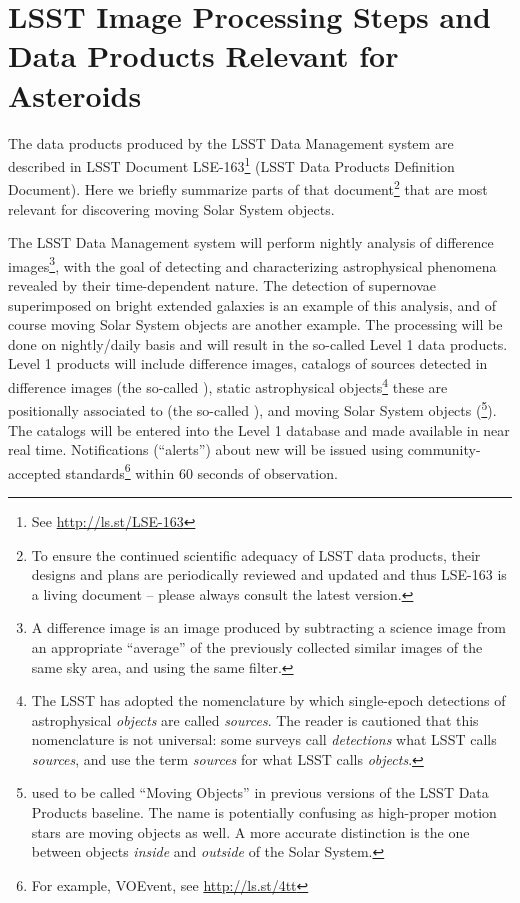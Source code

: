 \section{LSST Image Processing Steps and Data Products Relevant for Asteroids} \label{sec:AppA}

The data products produced by the LSST Data Management system are described in
LSST Document LSE-163\footnote{See \url{http://ls.st/LSE-163}} (LSST Data Products
Definition Document). Here we briefly summarize parts of that
document\footnote{To ensure the continued scientific adequacy of LSST data
products, their designs and plans are periodically reviewed and updated and
thus LSE-163 is a living document -- please always consult the latest version.}
that are most relevant for discovering moving Solar System objects.

The LSST Data Management system will perform nightly analysis of difference images\footnote{A difference
image is an image produced by subtracting a science image from an appropriate
``average'' of the previously collected similar images of the same sky area, and using the
same filter.}, with the goal of detecting and characterizing astrophysical phenomena
revealed by their time-dependent nature. The detection of supernovae superimposed
on bright extended galaxies is an example of this analysis, and of course moving Solar
System objects are another example. The processing will be done on nightly/daily
basis and will result in the so-called Level 1 data products. Level 1 products will include
difference images, catalogs of sources detected in difference images (the so-called
\DIASources), static astrophysical objects\footnote{The LSST has adopted the nomenclature by
which single-epoch detections of astrophysical {\em objects} are called {\em sources}.
The reader is cautioned that this nomenclature is not universal: some surveys call
{\em detections} what LSST calls {\em sources}, and use the term {\em sources} for what
LSST calls {\em objects}.} these \DIASources are positionally associated to (the so-called \DIAObjects),
and moving Solar System objects (\SSObjects\footnote{\SSObjects used to be called
``Moving Objects'' in previous versions of the LSST Data Products baseline. The name is
potentially confusing as high-proper motion stars are moving objects as well. A more
accurate distinction is the one between objects {\em inside} and {\em outside} of the Solar
System.}). The catalogs will be entered into the Level 1 database and made available in near
real time. Notifications (``alerts'') about new \DIASources will be issued using
community-accepted standards\footnote{For example, VOEvent, see \url{http://ls.st/4tt}} within
60 seconds of observation.

